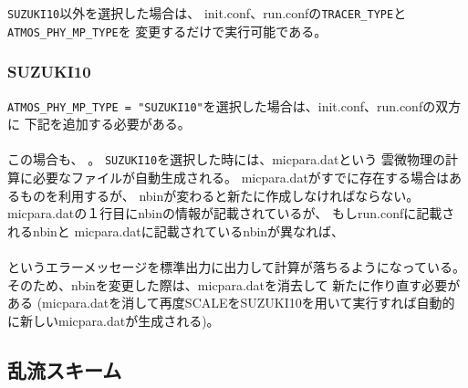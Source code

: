 \verb|SUZUKI10|以外を選択した場合は、
init.conf、run.confの\verb|TRACER_TYPE|と\verb|ATMOS_PHY_MP_TYPE|を
変更するだけで実行可能である。


\subsubsection{SUZUKI10}
\verb|ATMOS_PHY_MP_TYPE = "SUZUKI10"|を選択した場合は、init.conf、run.confの双方に
下記を追加する必要がある。\\

\\

この場合も、
{\color{red}{init.confとrun.confに記載される\verb|PARAM_BIN|は同一にする必要がある}}。
\verb|SUZUKI10|を選択した時には、micpara.datという
雲微物理の計算に必要なファイルが自動生成される。
micpara.datがすでに存在する場合はあるものを利用するが、
nbinが変わると新たに作成しなければならない。
micpara.datの１行目にnbinの情報が記載されているが、
もしrun.confに記載されるnbinと
micpara.datに記載されているnbinが異なれば、\\

\\

\noindent というエラーメッセージを標準出力に出力して計算が落ちるようになっている。
そのため、nbinを変更した際は、micpara.datを消去して
新たに作り直す必要がある
(micpara.datを消して再度SCALEをSUZUKI10を用いて実行すれば自動的に新しいmicpara.datが生成される)。



\subsection{乱流スキーム} \label{sec:basic_turbulence}

